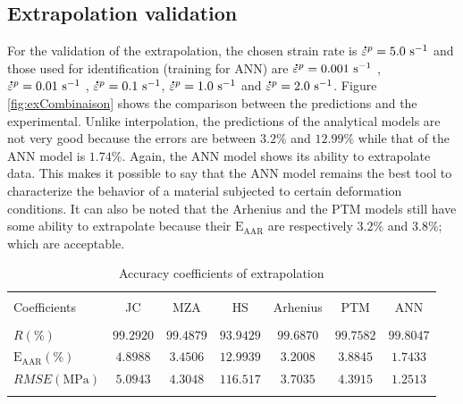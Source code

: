 \documentclass[twoside,english,1p,final,sort&compress]{elsarticle}
\theoremstyle{plain}
\newcommand{\mdot}[1]{\accentset{\mbox{\bfseries .}}{#1}}
\newcommand{\AARE}{\text{E}_\text{AAR}}
\begin{document}
\subsection{Extrapolation validation}
For the validation of the extrapolation, the chosen strain rate is $\mdot{\varepsilon}^p = 5.0\ \text{s}^{-1}$ and those used for identification (training for ANN) are $\mdot{\varepsilon}^p = 0.001\ \text{s}^{-1}$ , $\mdot{\varepsilon}^p = 0.01\ \text{s}^{-1}$ , $\mdot{\varepsilon}^p = 0.1\ \text{s}^{-1}$, $\mdot{\varepsilon}^p = 1.0\ \text{s}^{-1}$  and $\mdot{\varepsilon}^p = 2.0\ \text{s}^{-1}$. Figure \ref{fig:exCombinaison} shows the comparison between the predictions  and the experimental. Unlike interpolation, the predictions of the analytical models are not very good because the errors are between $3.2\%$ and $12.99\%$ while that of the ANN model is $1.74\%$. Again, the ANN model shows its ability to extrapolate data. This makes it possible to say that the ANN model remains the best tool to characterize the behavior of a material subjected to certain deformation conditions. It can also be noted that the Arhenius and the PTM models still have some ability to extrapolate because their $\AARE$ are respectively $ 3.2 \% $ and $ 3.8 \%$; which are acceptable.
\begin{table}[h!]
\centering{}
\caption{Accuracy coefficients of extrapolation}
\begin{tabular}{lcccccc}
\hline
&		&		&         &             &		   &	\\
Coefficients&JC  & MZA  &HS  & Arhenius      & PTM  &ANN \\
&				&				&         &             &	&\\
\hline
$R(\%)$&$99.2920$&$99.4879$&$93.9429$&$99.6870$& $99.7582$&$99.8047$\\
$\AARE(\%)$&$4.8988$&$3.4506$&$12.9939$&$3.2008$&$3.8845$&$1.7433$\\
$RMSE(\text{MPa})$&$5.0943$&$4.3048$&$116.517$&$3.7035$&$4.3915$&$1.2513$ \\
\hline
\label{tab:exValid}
\end{tabular}
\end{table}
\end{document}

